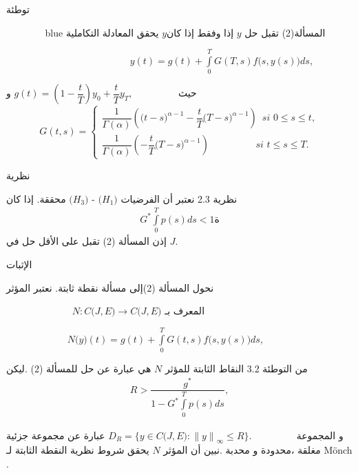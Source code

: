 \documentclass[dvipsnames,mathserif]{beamer}
\begin{document}
\begin{frame}{توطئة}
\vspace{-0.5cm}
\begin{box2}{\textcolor{white}{توطئة 4.2}}{blue}
{\LARGE{}}  
المسألة(2) تقبل حل
$y$ 
إذا وفقط إذا كان$y$ 
يحقق المعادلة التكاملية
 
~~~~~~~~~~~~~~~~~~~~~~~~~
$y(t) = g(t) + {\displaystyle \int\limits_0^T} {G(T,s)} f\big(s,y(s)\big)ds,$

حيث ~~~~~~~~
$g(t) = \left( {1 - \dfrac{t}{T}} \right){y_0} + \dfrac{t}{T}{y_T},$
و
$$G(t,s) = \begin{cases}\dfrac{1}{{\Gamma (\alpha )}}\left( 
{\big(t - s\big)^{\alpha  - 1}} - \dfrac{t}{T}{\big(T - s\big)^{\alpha  - 1}}\right)\,\,\,si\,\,0 \le s \le t,\\
\dfrac{1}{{\Gamma (\alpha )}} \left(- \dfrac{t}{T}{\big(T - s\big)^{\alpha  - 1}}\right)\,\,\,\,\,\,\,\,\,\,\,\,\,\,\,\,\,\,\,\,\,\,\,\,\,\,\,\,\,si\,\,t \le s \le T.
\end{cases}$$
\end{box2}
\end{frame}
\begin{frame}{نظرية}
\begin{mybox}[colbacktitle = green]{نظرية 2.3}
{\LARGE{}}
نعتبر أن الفرضيات
$\big({H_1}\big)$
-
$\big({H_3\big)}$
محققة.
إذا كان 
\begin{align}
{G^*}{\displaystyle \int\limits_0^T} {p(s)ds < 1}ة
\end{align}
إذن المسألة (2) تقبل على الأقل حل في $J$.
\end{mybox}
\end{frame}
\begin{frame}{الإثبات}
\begin{tcolorbox}[enhanced,arc=3mm,boxrule=1.5mm,boxsep=1.5mm,
colback=yellow!20!white,
colframe=blue,
borderline={1mm}{1mm}{yellow},
borderline={1mm}{2mm}{green} ]
نحول المسألة (2)إلى مسألة نقطة ثابتة.
نعتبر المؤثر

~~~~~~~~~~~~~
$N:C\big(J,E\big) \to C\big(J,E\big)$
المعرف بـ 

~~~~~~~~~~~~
$N\big(y\big)(t) = g(t) + {\displaystyle \int\limits_0^T} {G(t,s)} f\big(s,y(s)\big)ds,$

من 
التوطئة 3.2
النقاط الثابتة للمؤثر
$N$
هي عبارة عن حل للمسألة (2)
.ليكن
\begin{align*}
R > \dfrac{{{g^*}}}{{1 - {G^*}{  \int\limits_0^T }{p(s)ds} }},
\end{align*}
\end{tcolorbox}
\end{frame}
\begin{frame}
\begin{tcolorbox}[enhanced,arc=3mm,boxrule=1.5mm,boxsep=1.5mm,
colback=yellow!20!white,
colframe=blue,
borderline={1mm}{1mm}{yellow},
borderline={1mm}{2mm}{green} ]
و المجموعة ~~~~~~~~
$D_{R}=\bigg\{ y \in C\big( J,E\big):{\big\|y\big\|}_{\infty} \le R\bigg\} .$
عبارة عن مجموعة جزئية مغلقة ،محدودة و محدبة .نبين أن المؤثر
$N$
يحقق شروط نظرية النقطة الثابتة لـ 
Mönch 
.
\end{tcolorbox}
\end{frame}
\end{document}
